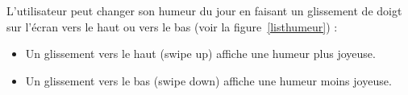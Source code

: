 \documentclass{article}[a4paper,12pt]
\begin{document}
L'utilisateur peut changer son humeur du jour en faisant un glissement de doigt
sur l'écran vers le haut ou vers le bas (voir la figure~\ref{listhumeur}) :
\begin{itemize}
\item Un glissement vers le haut (swipe up) affiche une humeur plus joyeuse.
\item Un glissement vers le bas (swipe down) affiche une humeur moins joyeuse.
\end{itemize}

\begin{figure}[h]
  \centering
\end{figure}
\end{document}
